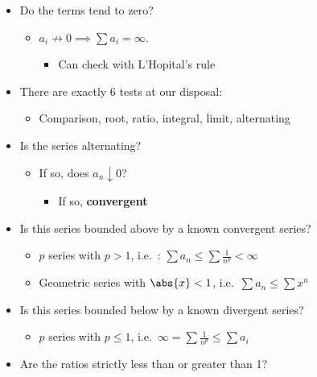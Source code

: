 \begin{itemize}
\tightlist
\item
  Do the terms tend to zero?

  \begin{itemize}
  \tightlist
  \item
    \(a_i \not\to 0 \implies \sum a_i = \infty\).

    \begin{itemize}
    \tightlist
    \item
      Can check with L'Hopital's rule
    \end{itemize}
  \end{itemize}
\item
  There are exactly 6 tests at our disposal:

  \begin{itemize}
  \tightlist
  \item
    Comparison, root, ratio, integral, limit, alternating
  \end{itemize}
\item
  Is the series alternating?

  \begin{itemize}
  \tightlist
  \item
    If so, does \(a_n \downarrow 0\)?

    \begin{itemize}
    \tightlist
    \item
      If so, \textbf{convergent}
    \end{itemize}
  \end{itemize}
\item
  Is this series bounded above by a known convergent series?

  \begin{itemize}
  \tightlist
  \item
    \(p\) series with \(p>1\), i.e.~:
    \(\sum a_n \leq \sum \frac{1}{n^p} < \infty\)
  \item
    Geometric series with \(\abs{x} < 1\),
    i.e.~\(\sum a_n \leq \sum x^n\)
  \end{itemize}
\item
  Is this series bounded below by a known divergent series?

  \begin{itemize}
  \tightlist
  \item
    \(p\) series with \(p\leq 1\),
    i.e.~\(\infty = \sum \frac{1}{n^p} \leq \sum a_i\)
  \end{itemize}
\item
  Are the ratios strictly less than or greater than 1?


\end{itemize}
